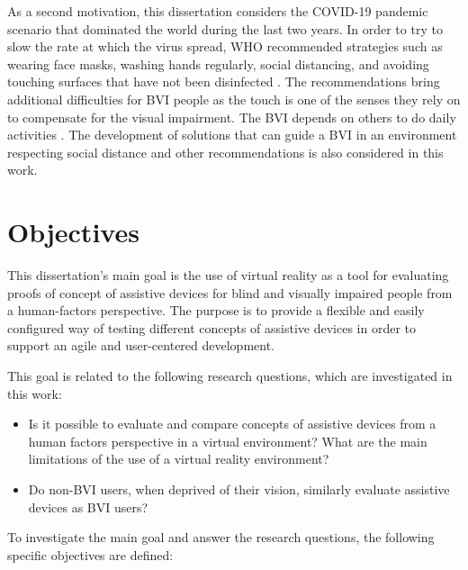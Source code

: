 As a second motivation, this dissertation considers the COVID-19 pandemic scenario that dominated the world during the last two years. In order to try to slow the rate at which the virus spread, WHO recommended strategies such as wearing face masks, washing hands regularly, social distancing, and avoiding touching surfaces that have not been disinfected \cite{who_2020}. The recommendations bring additional difficulties for BVI people as the touch is one of the senses they rely on to compensate for the visual impairment. The BVI depends on others to do daily activities \cite{jondani2021strategies}. The development of solutions that can guide a BVI in an environment respecting social distance and other recommendations is also considered in this work.

\section{Objectives}
\label{sec:objetivos}

    

 This dissertation's main goal is the use of virtual reality as a tool for evaluating proofs of concept of assistive devices for blind and visually impaired people from a human-factors perspective. The purpose is to provide a flexible and easily configured way of testing different concepts of assistive devices in order to support an agile and user-centered development.

 This goal is related to the following research questions, which are investigated in this work:

 \begin{itemize}
    \item Is it possible to evaluate and compare concepts of assistive devices from a human factors perspective in a virtual environment? What are the main limitations of the use of a virtual reality environment? \label{itm:obj_first}
    \item Do non-BVI users, when deprived of their vision, similarly evaluate assistive devices as BVI users? \label{itm:obj_second}
\end{itemize}
  
 To investigate the main goal and answer the research questions, the following specific objectives are defined:
 

